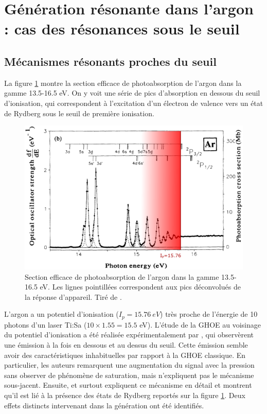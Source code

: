 \section{Génération résonante dans l'argon : cas des résonances sous le seuil}
\subsection{Mécanismes résonants proches du seuil}
La figure \ref{fig:ArIp} montre la section efficace de photoabsorption de l'argon dans la gamme 13.5-16.5 eV. On y voit une série de pics d'absorption en dessous du seuil d'ionisation, qui correspondent à l'excitation d'un électron de valence vers un état de Rydberg sous le seuil de première ionisation.

\begin{figure}[!ht]
\centering
\includegraphics[width=0.9\columnwidth]{Figures/ResonantArgon/argon_spectrum.png}%
\caption{Section efficace de photoabsorption de l'argon dans la gamme 13.5-16.5 eV. Les lignes pointillées correspondent aux pics déconvolués de la réponse d'appareil. Tiré de .}
\label{fig:ArIp}%
\end{figure}

L'argon a un potentiel d'ionisation ($I_p = \SI{15.76}{eV}$) très proche de l'énergie de 10 photons d'un laser\shorthandoff{:} Ti:Sa \shorthandon{:}($10\times 1.55 = 15.5$ eV). L'étude de la GHOE au voisinage du potentiel d'ionisation a été réalisée expérimentalement par , qui observèrent une émission à la fois en dessous et au dessus du seuil. Cette émission semble avoir des caractéristiques inhabituelles par rapport à la GHOE classique. En particulier, les auteurs remarquent une augmentation du signal avec la pression sans observer de phénomène de saturation, mais n'expliquent pas le mécanisme sous-jacent. Ensuite,  et surtout  expliquent ce mécanisme en détail et montrent qu'il est lié à la présence des états de Rydberg reportés sur la figure \ref{fig:ArIp}. Deux effets distincts intervenant dans la génération ont été identifiés.

